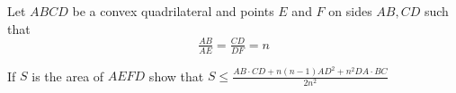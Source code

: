 Let $ABCD$ be a convex quadrilateral and points $E$ and $F$ on sides $AB,CD$ such that\[\tfrac{AB}{AE}=\tfrac{CD}{DF}=n\]

If $S$ is the area of $AEFD$ show that ${S\leq\frac{AB\cdot CD+n(n-1)AD^2+n^2DA\cdot BC}{2n^2}}$